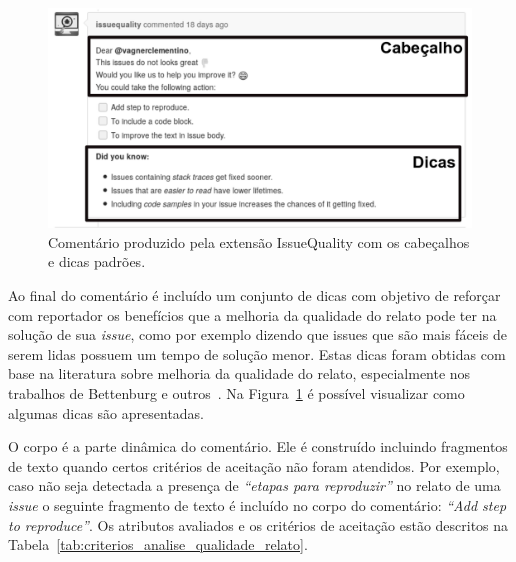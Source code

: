 \begin{figure}[htpb]
    \centering
    \includegraphics[width=0.8\linewidth]{chapter-implementacao-extensoes-fgrm/img/issue_original.png}
    \caption{Comentário produzido pela extensão IssueQuality com os cabeçalhos e
        dicas padrões.}
\label{fig:issue_original}
\end{figure}

Ao final do comentário é incluído um conjunto de dicas com objetivo de reforçar
com reportador os benefícios que a melhoria da qualidade do relato pode ter na
solução de sua \textit{issue}, como por exemplo dizendo que issues que são mais
fáceis de serem lidas possuem um tempo de solução menor. Estas dicas foram
obtidas com base na literatura sobre melhoria da qualidade do relato,
especialmente nos trabalhos de Bettenburg e outros~\cite{bettenburg2007quality,
    bettenburg2008makes}. Na Figura~\ref{fig:issue_original} é possível
visualizar como algumas dicas são apresentadas.

O corpo é a parte dinâmica do comentário. Ele é construído incluindo fragmentos
de texto quando certos critérios de aceitação não foram atendidos.  Por exemplo,
caso não seja detectada a presença de \textit{``etapas para reproduzir''} no
relato de uma \textit{issue} o seguinte fragmento de texto é incluído no corpo
do comentário: \textit{``Add step to reproduce''}. Os atributos avaliados e os
critérios de aceitação estão descritos na
Tabela~\ref{tab:criterios_analise_qualidade_relato}.

